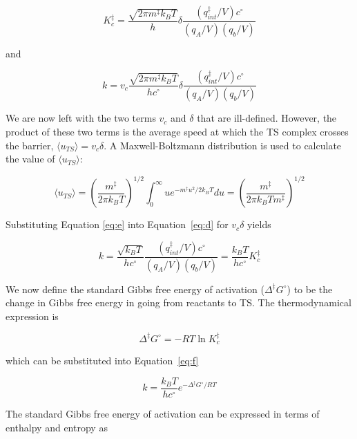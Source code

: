 \begin{doublespace}
\begin{equation}
  K_c^{\ddagger} =  \frac{\sqrt{2\pi m^\ddagger k_B T}}{h}\delta\frac{(q_{int}^\ddagger/V)c^\circ}{(q_A/V)(q_b/V)}
\end{equation}

\noindent and

\begin{equation}
 k = v_c \frac{\sqrt{2\pi m^\ddagger
     k_B T}}{hc^\circ}\delta\frac{(q_{int}^\ddagger/V)c^\circ}{(q_A/V)(q_b/V)}
\label{eq:d}
\end{equation}

We are now left with the two terms $v_c$ and $\delta$ that are ill-defined.
However, the product of these two terms is the average speed at which the TS
complex crosses the barrier, $\langle u_{TS} \rangle = v_c\delta$. A
Maxwell-Boltzmann distribution is used to calculate the value of $\langle
u_{TS} \rangle$:

\begin{equation}
  \langle u_{TS} \rangle = \left( \frac{m^\ddagger}{2\pi k_B T} \right)^{1/2}
  \int_0^\infty u e^{-m^\ddagger u^2/2k_B T}du = \left( \frac{m^\ddagger}{2\pi
      k_B T m^\ddagger} \right)^{1/2}
\label{eq:e}
\end{equation}

\noindent Substituting Equation \ref{eq:e} into Equation~\ref{eq:d} for
$v_c\delta$ yields

\begin{equation}
  k =
  \frac{\sqrt{k_B T}}{hc^\circ}\frac{(q_{int}^\ddagger/V)c^\circ}{(q_A/V)(q_b/V)} = \frac{k_B T}{hc^\circ}K_c^\ddagger
\label{eq:f}
\end{equation}

We now define the standard Gibbs free energy of activation ($\Delta ^\ddagger
G^\circ$) to be the change in Gibbs free energy in going from reactants to TS.\@
The thermodynamical expression is

\begin{equation}
  \Delta ^\ddagger G^\circ = -RT \ln K_c^\ddagger
\end{equation}

\noindent which can be substituted into Equation~\ref{eq:f}

\begin{equation}
  k = \frac{k_B T}{hc^\circ} e^{-\Delta^\ddagger G^\circ/RT}
\label{eq:g}
\end{equation}

The standard Gibbs free energy of activation can be expressed in terms of
enthalpy and entropy as


\end{doublespace}
